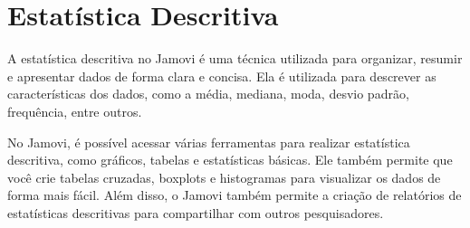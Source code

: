 \chapter{Estatística Descritiva}

A estatística descritiva no Jamovi é uma técnica utilizada para organizar, resumir e apresentar dados de forma clara e concisa. Ela é utilizada para descrever as características dos dados, como a média, mediana, moda, desvio padrão, frequência, entre outros.

No Jamovi, é possível acessar várias ferramentas para realizar estatística descritiva, como gráficos, tabelas e estatísticas básicas. Ele também permite que você crie tabelas cruzadas, boxplots e histogramas para visualizar os dados de forma mais fácil. Além disso, o Jamovi também permite a criação de relatórios de estatísticas descritivas para compartilhar com outros pesquisadores.

\faYoutube{}